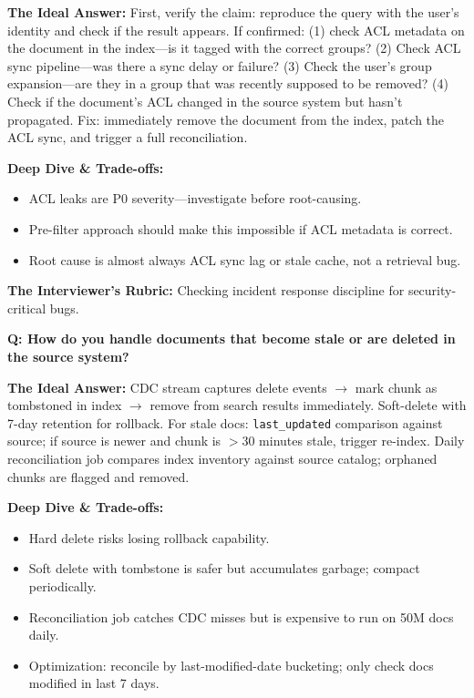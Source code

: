 \textbf{The Ideal Answer:} First, verify the claim: reproduce the query with the user's identity and check if the result appears. If confirmed: (1) check ACL metadata on the document in the index---is it tagged with the correct groups? (2) Check ACL sync pipeline---was there a sync delay or failure? (3) Check the user's group expansion---are they in a group that was recently supposed to be removed? (4) Check if the document's ACL changed in the source system but hasn't propagated. Fix: immediately remove the document from the index, patch the ACL sync, and trigger a full reconciliation.

\textbf{Deep Dive \& Trade-offs:}
\begin{itemize}
  \item ACL leaks are P0 severity---investigate before root-causing.
  \item Pre-filter approach should make this impossible if ACL metadata is correct.
  \item Root cause is almost always ACL sync lag or stale cache, not a retrieval bug.
\end{itemize}

\textbf{The Interviewer's Rubric:} Checking incident response discipline for security-critical bugs.

\textbf{Q: How do you handle documents that become stale or are deleted in the source system?}

\textbf{The Ideal Answer:} CDC stream captures delete events $\rightarrow$ mark chunk as tombstoned in index $\rightarrow$ remove from search results immediately. Soft-delete with 7-day retention for rollback. For stale docs: \texttt{last\_updated} comparison against source; if source is newer and chunk is $>$30 minutes stale, trigger re-index. Daily reconciliation job compares index inventory against source catalog; orphaned chunks are flagged and removed.

\textbf{Deep Dive \& Trade-offs:}
\begin{itemize}
  \item Hard delete risks losing rollback capability.
  \item Soft delete with tombstone is safer but accumulates garbage; compact periodically.
  \item Reconciliation job catches CDC misses but is expensive to run on 50M docs daily.
  \item Optimization: reconcile by last-modified-date bucketing; only check docs modified in last 7 days.
\end{itemize}

